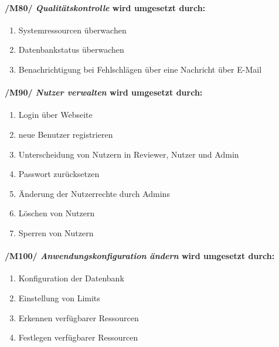 \paragraph{/M80/ \textit{Qualitätskontrolle} wird umgesetzt durch:}

\begin{enumerate}
    \setlength\itemsep{-1em}
    \setcounter{enumi}{\value{FAs}}
    \item Systemressourcen überwachen
    \item Datenbankstatus überwachen
    \item Benachrichtigung bei Fehlschlägen über eine Nachricht über E-Mail
    \setcounter{FAs}{\value{enumi}}
\end{enumerate}
    
\paragraph{/M90/ \textit{Nutzer verwalten} wird umgesetzt durch:}

\begin{enumerate}
    \setlength\itemsep{-1em}
    \setcounter{enumi}{\value{FAs}}
    \item Login über Webseite
    \item neue Benutzer registrieren
    \item Unterscheidung von Nutzern in \gls{Reviewer}, \gls{Nutzer} und \gls{Admin}
    \item Passwort zurücksetzen
    \item Änderung der Nutzerrechte durch \glspl{Admin}
    \item Löschen von Nutzern
    \item Sperren von Nutzern %
    \setcounter{FAs}{\value{enumi}}
\end{enumerate}
    
\paragraph{/M100/ \textit{Anwendungskonfiguration ändern} wird umgesetzt durch:}

\begin{enumerate}
    \setlength\itemsep{-1em}
    \setcounter{enumi}{\value{FAs}}
    \item Konfiguration der Datenbank
    \item Einstellung von \gls{Limits} %
    \item Erkennen verfügbarer \gls{Ressourcen}
    \item Festlegen verfügbarer Ressourcen
\end{enumerate}